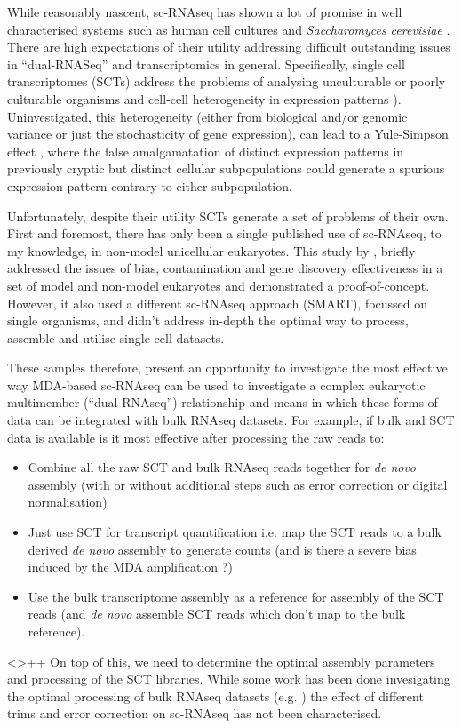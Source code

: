 While reasonably nascent, sc-RNAseq has shown a lot of promise in well characterised systems such as human cell cultures \citep{Bengtsson2005,Shalek2013}
and \textit{Saccharomyces cerevisiae} \citep{Lipson2009}.  
There are high expectations of their utility addressing difficult outstanding issues in ``dual-RNASeq'' \citep{Westermann2012} and transcriptomics 
in general. Specifically, single cell transcriptomes (SCTs) address the problems of analysing unculturable or poorly culturable
organisms \citep{Murray2012} and cell-cell heterogeneity in expression patterns \citep{Raj2008,Shalek2013}).  
Uninvestigated, this heterogeneity (either from biological and/or genomic variance or just the stochasticity of gene expression),
can lead to a Yule-Simpson effect \citep{Yule1903a,Simpson1951}, where the false amalgamatation of distinct expression patterns
in previously cryptic but distinct cellular subpopulations could generate a spurious expression pattern contrary to either subpopulation.

Unfortunately, despite their utility SCTs generate a set of problems of their own.  First and foremost, there has only been a single
published use of sc-RNAseq, to my knowledge, in non-model unicellular eukaryotes.   This study by \citep{Kolisko2014}, 
briefly addressed the issues of bias, contamination and gene discovery effectiveness in a set of model and non-model eukaryotes and
demonstrated a proof-of-concept.  However, it also used a different sc-RNAseq approach (SMART), focussed on single organisms, 
and didn't address in-depth the optimal way to process, assemble and utilise single cell datasets.

These samples therefore, present an opportunity to investigate the most effective way MDA-based sc-RNAseq can be used
to investigate a complex eukaryotic multimember (``dual-RNAseq'') relationship and means in which these forms of data
can be integrated with bulk RNAseq datasets.  For example, if bulk and SCT data is available is it most effective after processing
the raw reads to:
\begin{itemize}
    \item Combine all the raw SCT and bulk RNAseq reads together for \textit{de novo} assembly (with or without additional steps such as error correction or digital normalisation)
    \item Just use SCT for transcript quantification i.e. map the SCT reads to a bulk derived \textit{de novo} assembly to generate counts (and is there a severe bias induced 
        by the MDA amplification \citep{Liang2014}?)
    \item Use the bulk transcriptome assembly as a reference for assembly of the SCT reads (and \textit{de novo} assemble SCT reads which don't map to the bulk reference).
\end{itemize}  <>++
On top of this, we need to determine the optimal assembly parameters and processing of the SCT libraries.   While some work
has been done invesigating the optimal processing of bulk RNAseq datasets (e.g. \citep{Macmanes2013,Macmanes2015}) the effect of
different trims and error correction on sc-RNAseq has not been characterised.


